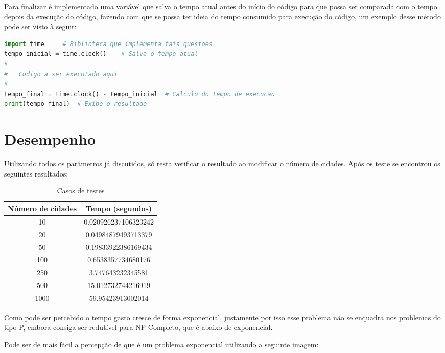 \documentclass{article}
\begin{document}
Para finalizar é implementado uma variável que salva o tempo atual antes do início do código para que possa ser comparada com o tempo depois da execução do código, fazendo com que se possa ter ideia do tempo consumido para execução do código, um exemplo desse método pode ser visto à seguir:

\begin{lstlisting}[language=Python, caption={Cálculo tempo de execução.}]
import time     # Biblioteca que implementa tais questoes
tempo_inicial = time.clock()    # Salva o tempo atual
#
#   Codigo a ser executado aqui
#
tempo_final = time.clock() - tempo_inicial  # Calculo do tempo de execucao
print(tempo_final)  # Exibe o resultado
\end{lstlisting}

\section{Desempenho}
Utilizando todos os parâmetros já discutidos, só resta verificar o resultado ao modificar o número de cidades.
Após os teste se encontrou os seguintes resultados:
\newpage
\begin{table}[h!]
    \begin{center}
      \caption{Casos de testes}
      \label{tab:table1}
      \begin{tabular}{|c||c|}
        \hline
        \textbf{Número de cidades} & \textbf{Tempo (segundos)}\\
        \hline
        10 & 0.020926237106323242\\\hline
        20 & 0.04984879493713379\\\hline
        50 & 0.19833922386169434\\\hline
        100 & 0.6538357734680176\\\hline
        250 & 3.747643232345581\\\hline
        500 & 15.012732744216919\\\hline
        1000 & 59.95423913002014\\\hline
        \hline
      \end{tabular}
    \end{center}
  \end{table}
  Como pode ser percebido o tempo gasto cresce de forma exponencial, justamente por isso esse problema não se enquadra nos problemas do tipo P, embora consiga ser redutível para NP-Completo, que é abaixo de exponencial.

  Pode ser de mais fácil a percepção de que é um problema exponencial utilizando a seguinte imagem:
\end{document}
